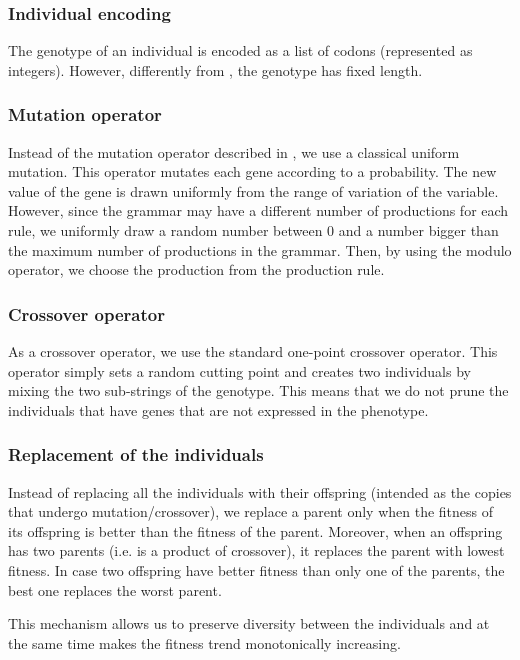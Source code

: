 \documentclass[review,english]{elsarticle}
\begin{document}
\subsubsection{Individual encoding}
The genotype of an individual is encoded as a list of codons (represented as integers).
However, differently from \cite{goos_grammatical_1998}, the genotype has fixed length.

\subsubsection{Mutation operator}
Instead of the mutation operator described in \cite{goos_grammatical_1998}, we use a classical uniform mutation.
This operator mutates each gene according to a probability.
The new value of the gene is drawn uniformly from the range of variation of the variable.
However, since the grammar may have a different number of productions for each rule, we uniformly draw a random number between 0 and a number bigger than the maximum number of productions in the grammar.
Then, by using the modulo operator, we choose the production from the production rule.

\subsubsection{Crossover operator}
As a crossover operator, we use the standard one-point crossover operator.
This operator simply sets a random cutting point and creates two individuals by mixing the two sub-strings of the genotype.
This means that we do not prune the individuals that have genes that are not expressed in the phenotype.

\subsubsection{Replacement of the individuals}
Instead of replacing all the individuals with their offspring (intended as the copies that undergo mutation/crossover), we replace a parent only when the fitness of its offspring is better than the fitness of the parent.
Moreover, when an offspring has two parents (i.e. is a product of crossover), it replaces the parent with lowest fitness.
In case two offspring have better fitness than only one of the parents, the best one replaces the worst parent.

This mechanism allows us to preserve diversity between the individuals and at the same time makes the fitness trend monotonically increasing.
\end{document}
